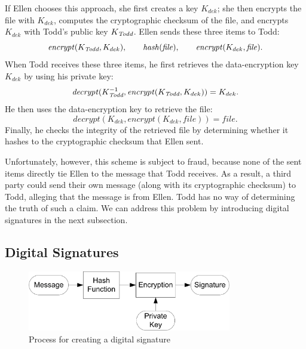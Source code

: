 If Ellen chooses this approach, she first creates a key $K_{dek}$; she
then encrypts the file with $K_{dek}$, computes the cryptographic
checksum of the file, and encrypts $K_{dek}$ with Todd's public key
$K_{\textit{Todd}}$. Ellen sends these three items to Todd:
\[ \mathit{encrypt}(K_{\textit{Todd}},K_{dek}), \qquad
\mathit{hash}(\mathit{file}), \qquad \mathit{encrypt}(K_{dek},
\mathit{file}). 
\]
When Todd receives these three items, he first retrieves the
data-encryption key $K_{dek}$ by using his private key:
\[ \mathit{decrypt}(K^{-1}_{\textit{Todd}},\mathit{encrypt}(K_{\textit{Todd}},
K_{dek})) = K_{dek}. \]
He then uses the data-encryption key to retrieve the file:
\[ \mathit{decrypt}(K_{dek},\mathit{encrypt}(K_{dek},\mathit{file})) = \mathit{file}.\]
Finally, he checks the integrity of the retrieved file by determining
whether it hashes to the cryptographic checksum that Ellen sent.  

Unfortunately, however, this scheme is subject to fraud, because none of
the sent items directly tie Ellen to the message that Todd receives.  As
a result, a third party could send their own message (along with its
cryptographic checksum) to Todd, alleging that the message is from
Ellen. Todd has no way of determining the truth of such a claim.  We
can address this problem by introducing digital signatures in the
next subsection.

\subsection{Digital Signatures}

\begin{figure}[tbp]
  \centering
  \includegraphics[width=3.5in]{Figures/pki/signature}
  \caption{Process for creating a digital signature}
  \label{fig:digital signature}
\end{figure}

